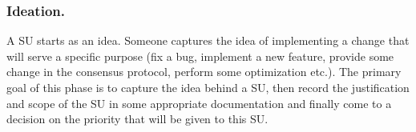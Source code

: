 \subsubsection{Ideation.}
A SU starts as an idea. Someone captures the idea of implementing a change that will serve a specific purpose (fix a bug, implement a new feature, provide some change in the consensus protocol, perform some optimization etc.). The primary goal of this phase is to capture the idea behind a SU, then record the justification and scope of the SU in some appropriate documentation and finally come to a decision on the priority that will be given to this SU. 


%

